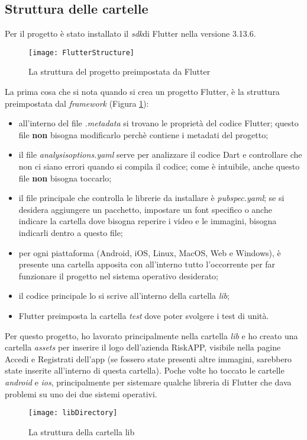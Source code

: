 \subsection{Struttura delle cartelle}
Per il progetto è stato installato il \emph{\gls{sdk}}\glsfirstoccur di Flutter nella versione 3.13.6.\newline  
\begin{figure}[!h] 
    \centering 
    \texttt{[image: FlutterStructure]} 
    \caption{La struttura del progetto preimpostata da Flutter}
    \label{fig:directory-flutter}
\end{figure}

La prima cosa che si nota quando si crea un progetto Flutter, è la struttura preimpostata dal \emph{framework} (Figura \ref{fig:directory-flutter}):
\begin{itemize}
    \item all'interno del file \emph{.metadata} si trovano le proprietà del codice Flutter; questo file \textbf{non} bisogna modificarlo perchè contiene i metadati del progetto;
    \item il file \emph{analysis\textunderscore options.yaml} serve per analizzare il codice Dart e controllare che non ci siano errori quando si compila il codice; come è intuibile, anche questo file \textbf{non} bisogna toccarlo;
    \item il file principale che controlla le librerie da installare è \emph{pubspec.yaml}; se si desidera aggiungere un pacchetto, impostare un font specifico o anche indicare la cartella dove bisogna reperire i video e le immagini, bisogna indicarli dentro a questo file;
    \item per ogni piattaforma (Android, iOS, Linux, MacOS, Web e Windows), è presente una cartella apposita con all'interno tutto l'occorrente per far funzionare il progetto nel sistema operativo desiderato;
    \item il codice principale lo si scrive all'interno della cartella \emph{lib};
    \item Flutter preimposta la cartella \emph{test} dove poter svolgere i test di unità.
\end{itemize}
Per questo progetto, ho lavorato principalmente nella cartella \emph{lib} e ho creato una cartella \emph{assets} per inserire il logo dell'azienda RiskAPP, visibile nella pagine Accedi e Registrati dell'app (se fossero state presenti altre immagini, sarebbero state inserite all'interno di questa cartella).\newline
Poche volte ho toccato le cartelle \emph{android} e \emph{ios}, principalmente per sistemare qualche libreria di Flutter che dava problemi su uno dei due sistemi operativi. 
\begin{figure}[!h] 
    \centering 
    \texttt{[image: libDirectory]} 
    \caption{La struttura della cartella lib}
    \label{fig:directory-lib}
\end{figure}

